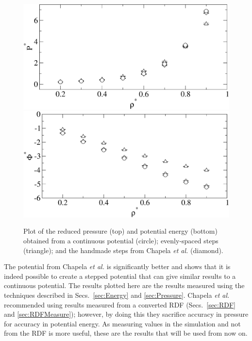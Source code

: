 \documentclass[12pt]{UoAthesis} \usepackage{booktabs}
\begin{document}
\begin{figure}[htp] 
  \begin{center}
    \includegraphics[clip,scale=0.45]{figures/ChapelaP} 
    \includegraphics[clip,scale=0.45]{figures/ChapelaU} 
    \caption[Comparison of continuous potential results with existing
    stepping methods] {Plot of the reduced pressure (top) and
      potential energy (bottom) obtained from a continuous potential
      (circle); evenly-spaced steps (triangle); and the handmade steps
      from Chapela \textit{et al.} (diamond).}
    \label{fig:prevComp}
  \end{center}
\end{figure}

The potential from Chapela \textit{et al.} is significantly better and
shows that it is indeed possible to create a stepped potential that
can give similar results to a continuous potential.  The results
plotted here are the results measured using the techniques described
in Secs.~\ref{sec:Energy} and \ref{sec:Pressure}.  Chapela \textit{et
  al.} recommended using results measured from a converted RDF
(Secs.~\ref{sec:RDF} and \ref{sec:RDFMeasure}); however, by doing this
they sacrifice accuracy in pressure for accuracy in potential energy.
As measuring values in the simulation and not from the RDF is more
useful, these are the results that will be used from now on.  
\end{document}

